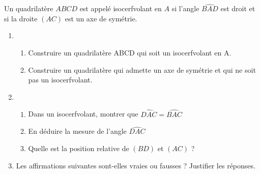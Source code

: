 \begin{Maquette}[Fiche,CorrigeFin,Colonnes=2]{}
\begin{multicols}{2}
      
      \begin{exercice}[Dur] %
         Un quadrilatère $ABCD$ est appelé isocerfvolant en $A$ si l'angle $\widehat{BAD}$ est droit et si la droite $(AC)$ est un axe de symétrie.
         \begin{enumerate}
            \item
               \begin{enumerate}
                  \item Construire un quadrilatère ABCD qui soit un isocerfvolant en A.
                  \item Construire un quadrilatère qui admette un axe de symétrie et qui ne soit pas un isocerfvolant.
               \end{enumerate}
            \item
               \begin{enumerate}
                  \item Dans un isocerfvolant, montrer que $\widehat{DAC} =\widehat{BAC}$
                  \item En déduire la mesure de l'angle $\widehat{DAC}$
                  \item Quelle est la position relative de $(BD)$ et $(AC)$ ?
               \end{enumerate}
            \item Les affirmations suivantes sont-elles vraies ou fausses ? Justifier les réponses.
            
         \end{enumerate}
      \end{exercice}
      

\end{multicols}
\end{Maquette}
